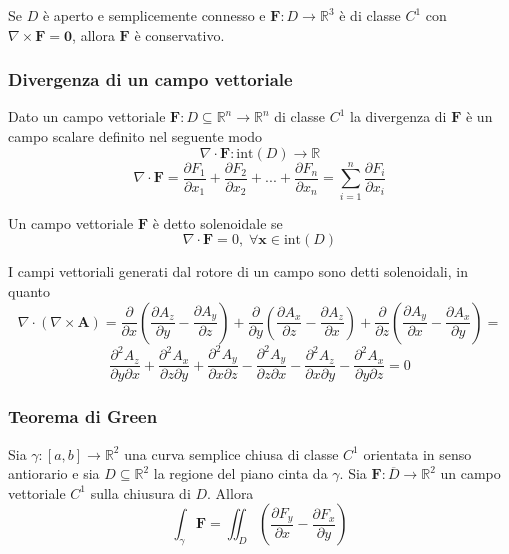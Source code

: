                 Se $D$ è aperto e semplicemente connesso e $\mathbf{F}: D \rightarrow \mathbb{R}^{3}$ è di classe $C^{1}$ con
                $\nabla \times \mathbf{F} = \mathbf{0}$, allora $\mathbf{F}$ è conservativo.

            \subsubsection{Divergenza di un campo vettoriale}
                Dato un campo vettoriale $\mathbf{F}: D \subseteq \mathbb{R}^{n} \rightarrow \mathbb{R}^{n}$ di classe $C^{1}$ la divergenza di $\mathbf{F}$ è un campo scalare definito nel seguente modo
                \[
                    \nabla \cdot \mathbf{F}: \text{int}(D) \rightarrow \mathbb{R}
                \]
                \[
                    \nabla \cdot \mathbf{F} = \frac{\partial F_{1}}{\partial x_{1}} + \frac{\partial F_{2}}{\partial x_{2}} + ... + \frac{\partial F_{n}}{\partial x_{n}} = \sum_{i = 1}^{n} \frac{\partial F_{i}}{\partial x_{i}}
                \]

                Un campo vettoriale $\mathbf{F}$ è detto solenoidale se
                \[
                    \nabla \cdot \mathbf{F} = 0, \; \forall \mathbf{x} \in \text{int}(D)
                \]

                I campi vettoriali generati dal rotore di un campo sono detti solenoidali, in quanto
                \[
                    \nabla \cdot (\nabla \times \mathbf{A}) = \frac{\partial }{\partial x} \left( \frac{\partial A_{z}}{\partial y} - \frac{\partial A_{y}}{\partial z} \right) + \frac{\partial}{\partial y} \left( \frac{\partial A_{x}}{\partial z} - \frac{\partial A_{z}}{\partial x} \right) + \frac{\partial}{\partial z} \left( \frac{\partial A_{y}}{\partial x} - \frac{\partial A_{x}}{\partial y} \right) =
                \]
                \[
                    \frac{\partial^{2} A_{z}}{\partial y \partial x} + \frac{\partial^{2} A_{x}}{\partial z \partial y} + \frac{\partial^{2} A_{y}}{\partial x \partial z} - \frac{\partial^{2} A_{y}}{\partial z \partial x} - \frac{\partial^{2} A_{z}}{\partial x \partial y} - \frac{\partial^{2} A_{x}}{\partial y \partial z} = 0
                \]


            \subsubsection{Teorema di Green}
                \begin{theorem}
                    Sia $\gamma: [a, b] \rightarrow \mathbb{R}^{2}$ una curva semplice chiusa di classe $C^{1}$ orientata in senso antiorario e sia $D \subseteq \mathbb{R}^{2}$ la regione del piano cinta da $\gamma$.
                    Sia $\mathbf{F}: \overline{D} \rightarrow \mathbb{R}^{2}$ un campo vettoriale $C^{1}$ sulla chiusura di $D$.
                    Allora
                    \[
                        \int_{\gamma} \mathbf{F} = \iint_{D} \left( \frac{\partial F_{y}}{\partial x} - \frac{\partial F_{x}}{\partial y} \right)
                    \]
                \end{theorem}

